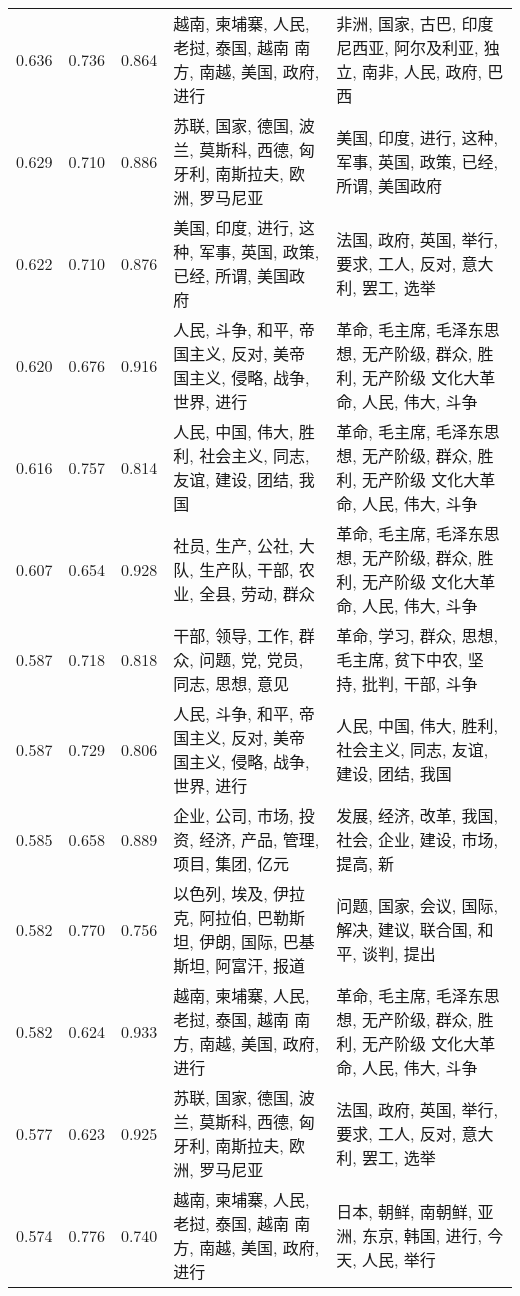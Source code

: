 \begin{tabular}{cccp{5cm}p{5cm}}
0.636 & 0.736 & 0.864 & 越南, 柬埔寨, 人民, 老挝, 泰国, 越南 南方, 南越, 美国, 政府, 进行 & 非洲, 国家, 古巴, 印度尼西亚, 阿尔及利亚, 独立, 南非, 人民, 政府, 巴西 \\
0.629 & 0.710 & 0.886 & 苏联, 国家, 德国, 波兰, 莫斯科, 西德, 匈牙利, 南斯拉夫, 欧洲, 罗马尼亚 & 美国, 印度, 进行, 这种, 军事, 英国, 政策, 已经, 所谓, 美国政府 \\
0.622 & 0.710 & 0.876 & 美国, 印度, 进行, 这种, 军事, 英国, 政策, 已经, 所谓, 美国政府 & 法国, 政府, 英国, 举行, 要求, 工人, 反对, 意大利, 罢工, 选举 \\
0.620 & 0.676 & 0.916 & 人民, 斗争, 和平, 帝国主义, 反对, 美帝国主义, 侵略, 战争, 世界, 进行 & 革命, 毛主席, 毛泽东思想, 无产阶级, 群众, 胜利, 无产阶级 文化大革命, 人民, 伟大, 斗争 \\
0.616 & 0.757 & 0.814 & 人民, 中国, 伟大, 胜利, 社会主义, 同志, 友谊, 建设, 团结, 我国 & 革命, 毛主席, 毛泽东思想, 无产阶级, 群众, 胜利, 无产阶级 文化大革命, 人民, 伟大, 斗争 \\
0.607 & 0.654 & 0.928 & 社员, 生产, 公社, 大队, 生产队, 干部, 农业, 全县, 劳动, 群众 & 革命, 毛主席, 毛泽东思想, 无产阶级, 群众, 胜利, 无产阶级 文化大革命, 人民, 伟大, 斗争 \\
0.587 & 0.718 & 0.818 & 干部, 领导, 工作, 群众, 问题, 党, 党员, 同志, 思想, 意见 & 革命, 学习, 群众, 思想, 毛主席, 贫下中农, 坚持, 批判, 干部, 斗争 \\
0.587 & 0.729 & 0.806 & 人民, 斗争, 和平, 帝国主义, 反对, 美帝国主义, 侵略, 战争, 世界, 进行 & 人民, 中国, 伟大, 胜利, 社会主义, 同志, 友谊, 建设, 团结, 我国 \\
0.585 & 0.658 & 0.889 & 企业, 公司, 市场, 投资, 经济, 产品, 管理, 项目, 集团, 亿元 & 发展, 经济, 改革, 我国, 社会, 企业, 建设, 市场, 提高, 新 \\
0.582 & 0.770 & 0.756 & 以色列, 埃及, 伊拉克, 阿拉伯, 巴勒斯坦, 伊朗, 国际, 巴基斯坦, 阿富汗, 报道 & 问题, 国家, 会议, 国际, 解决, 建议, 联合国, 和平, 谈判, 提出 \\
0.582 & 0.624 & 0.933 & 越南, 柬埔寨, 人民, 老挝, 泰国, 越南 南方, 南越, 美国, 政府, 进行 & 革命, 毛主席, 毛泽东思想, 无产阶级, 群众, 胜利, 无产阶级 文化大革命, 人民, 伟大, 斗争 \\
0.577 & 0.623 & 0.925 & 苏联, 国家, 德国, 波兰, 莫斯科, 西德, 匈牙利, 南斯拉夫, 欧洲, 罗马尼亚 & 法国, 政府, 英国, 举行, 要求, 工人, 反对, 意大利, 罢工, 选举 \\
0.574 & 0.776 & 0.740 & 越南, 柬埔寨, 人民, 老挝, 泰国, 越南 南方, 南越, 美国, 政府, 进行 & 日本, 朝鲜, 南朝鲜, 亚洲, 东京, 韩国, 进行, 今天, 人民, 举行 \\

\end{tabular}
